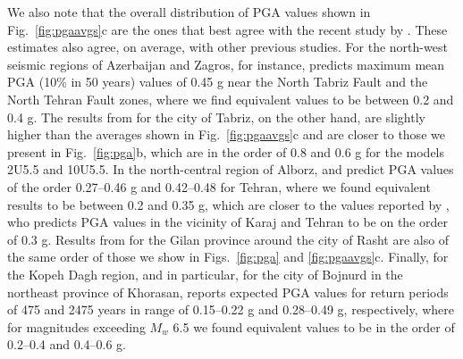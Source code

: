 

We also note that the overall distribution of PGA values shown in Fig.~\ref{fig:pgaavgs}c are the ones that best agree with the recent study by \citet{Khodaverdian_2016_BSSA}. These estimates also agree, on average, with other previous studies. For the north-west seismic regions of Azerbaijan and Zagros, for instance, \citet{Tavakoli1999} predicts maximum mean PGA (10\% in 50 years) values of 0.45 g near the North Tabriz Fault and the North Tehran Fault zones, where we find equivalent values to be between 0.2 and 0.4 g. The results from \citet{Vafaie2011} for the city of Tabriz, on the other hand, are slightly higher than the averages shown in Fig.~\ref{fig:pgaavgs}c and are closer to those we present in Fig.~\ref{fig:pga}b, which are in the order of 0.8 and 0.6 g for the models 2U5.5 and 10U5.5. In the north-central region of Alborz, \citet{Ghodrati2003} and \citet{Boostan2015} predict PGA values of the order 0.27--0.46 g and 0.42--0.48 for Tehran, where we found equivalent results to be between 0.2 and 0.35 g, which are closer to the values reported by \citet{Abdi2013}, who predicts PGA values in the vicinity of Karaj and Tehran to be on the order of 0.3 g. Results from \citet{Ghodrati2008} for the Gilan province around the city of Rasht are also of the same order of those we show in Figs.~\ref{fig:pga} and \ref{fig:pgaavgs}c. Finally, for the Kopeh Dagh region, and in particular, for the city of Bojnurd in the northeast province of Khorasan, \citet{Rahgozar2012} reports expected PGA values for return periods of 475 and 2475 years in range of 0.15--0.22 g and 0.28--0.49 g, respectively, where for magnitudes exceeding $M_w$ 6.5 we found equivalent values to be in the order of 0.2--0.4 and 0.4--0.6 g. 

